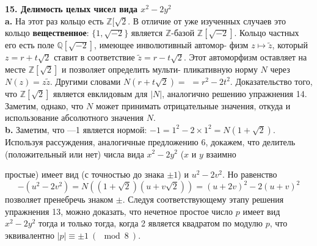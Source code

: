 \documentclass{mai_book}
\begin{document}
\noindent\textbf{15. Делимость целых чисел вида $x^2-2y^2$} \newline 
\\
\hspace*{15pt}\textbf{a.} На этот раз кольцо есть $\mathbb{Z}[\sqrt{2}$. В отличие от уже изученных\linebreak 
слу­чаев это кольцо \textbf{вещественное}: $\{1,\sqrt{-2}\}$ является $\mathbb{Z}$-базой $\mathbb{Z}[\sqrt{-2}]$.\linebreak
Кольцо частных его есть поле $\mathbb{Q}[\sqrt{-2}]$, имеющее инволютивный автомор-\linebreak
физм $z\mapsto\widetilde{z}$, который $z=r+t\sqrt{2}$ ставит в соответствие $\widetilde{z}=r-t\sqrt{2}$. Этот\linebreak
автоморфизм оставляет на месте $\mathbb{Z}[\sqrt{2}]$ и позволяет определить мульти-\linebreak
пликативную норму $N$ через $N(z)=z\widetilde{z}$. Другими словами $N(r+t\sqrt{2})=$\linebreak
$=r^2-2t^2$. Доказательство того, что $\mathbb{Z}[\sqrt{2}]$ является евклидовым для $|N|$,\linebreak
аналогично решению упражнения 14. Заметим, однако, что $N$ может\linebreak
принимать отрицательные значения, откуда и использование абсолют­ного\linebreak
значения $N$.\newline
\\
\hspace*{15pt}\textbf{b.} Заметим, что —1 является нормой: $-1=1^2-2\times1^2=N(1+\sqrt{2})$.\linebreak
Используя рассуждения, аналогичные предложению 6, докажем, что \linebreak
делитель\: (положительный или нет) числа\: вида\: $x^2-2y^2$\: ($x$\: и\: $y$\:\hspace{3pt} взаимно

\pagebreak
%
%
\noindent простые) имеет вид (с точностью до знака $\pm1$) и $u^2-2v^2$. Но равенство\linebreak
$$-(u^2-2v^2)=N((1+\sqrt{2})(u+v\sqrt{2}))=(u+2v)^2-2(u+v)^2$$
позволяет пренебречь знаком $\pm$. Следуя соответствующему этапу \linebreak
ре­шения упражнения 13, можно доказать, что нечетное простое число\linebreak
$p$ имеет вид $x^2-2y^2$ тогда и только тогда, когда 2 является квадратом\linebreak
по модулю $p$, что эквивалентно $|p|\equiv\pm1~(\mod{8}~)$.\newline
\\
\end{document}

